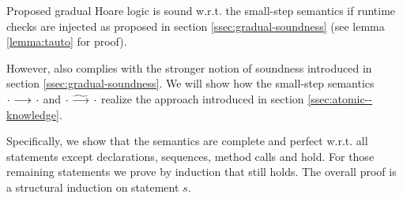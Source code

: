 Proposed gradual Hoare logic is sound w.r.t. the small-step semantics if runtime checks are injected as proposed in section \ref{ssec:gradual-soundness} (see lemma \ref{lemma:tauto} for proof).

However, \gvlidf also complies with the stronger notion of soundness  introduced in section \ref{ssec:gradual-soundness}.
We will show how the small-step semantics ${\cdot} \,\,{\longrightarrow^{}}\,\, {\cdot}$ and ${\cdot} \,\,{\widetilde{\longrightarrow}^{}}\,\, {\cdot}$ realize the approach introduced in section \ref{ssec:atomic--knowledge}.

Specifically, we show that the semantics are complete and perfect w.r.t. all statements except declarations, sequences, method calls and hold.
For those remaining statements we prove by induction that  still holds.
The overall proof is a structural induction on statement $s$.


